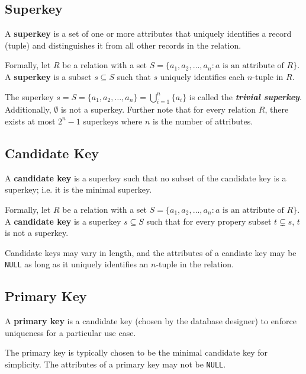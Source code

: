 \documentclass{report}
\newenvironment{definition}[1]{\begin{tcolorbox}[title={Definition: #1}]}{\end{tcolorbox}}
\renewcommand{\bf}[1]{\textbf{{#1}}}
\renewcommand{\tt}[1]{\texttt{{#1}}}
\newcommand{\ib}[1]{\textit{\textbf{{#1}}}}
\begin{document}
\subsection{Superkey}
\begin{definition}{Superkey}
    A \bf{superkey} is a set of one or more attributes that uniquely identifies a record (tuple) and 
    distinguishes it from all other records in the relation.\vspace{10pt}

    Formally, let $R$ be a relation with a set $S = \{a_1, a_2, \ldots, a_n : a 
    \text{ is an attribute of } R\}$. A \bf{superkey} is a subset $s \subseteq S$ such that $s$ 
    uniquely identifies each $n$-tuple in $R$.
\end{definition}
The superkey $s = S = \{a_1, a_2, \ldots, a_n\} = \bigcup^{n}_{i = 1} \{a_i\}$ is called the 
\ib{trivial superkey}. Additionally, $\emptyset$ is not a superkey. Further note that for every 
relation $R$, there exists at most $2^n - 1$ superkeys where $n$ is the number of 
attributes.


\subsection{Candidate Key}
\begin{definition}{Candidate Key}
    A \bf{candidate key} is a superkey such that no subset of the candidate key is a superkey; i.e.
    it is the minimal superkey. \vspace{10pt}

    Formally, let $R$ be a relation with a set $S = \{a_1, a_2, \ldots, a_n : a 
    \text{ is an attribute of } R\}$. A \bf{candidate key} is a superkey $s \subseteq S$ such that
    for every propery subset $t \subsetneq s$, $t$ is not a superkey.
\end{definition}
Candidate keys may vary in length, and the attributes of a candiate key may be \tt{NULL} as long as
it uniquely identifies an $n$-tuple in the relation.


\subsection{Primary Key}
\begin{definition}{Primary Key and Composite Key}
    A \bf{primary key} is a candidate key (chosen by the database designer) to enforce uniqueness
    for a particular use case.
\end{definition}
The primary key is typically chosen to be the minimal candidate key for simplicity. The attributes
of a primary key may not be \tt{NULL}. 
\end{document}
